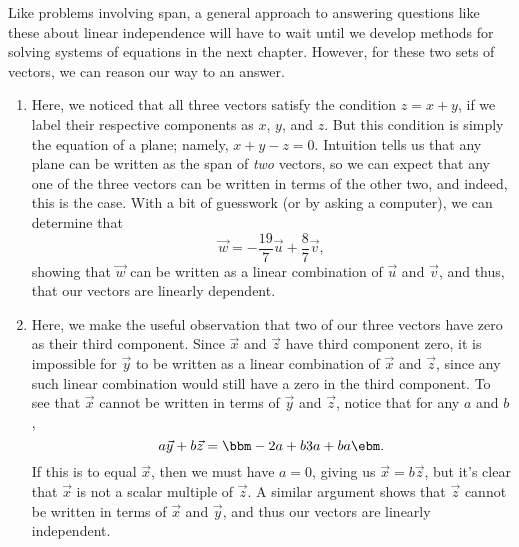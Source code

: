 {
Like problems involving span, a general approach to answering questions like these about linear independence will have to wait until we develop methods for solving systems of equations in the next chapter. However, for these two sets of vectors, we can reason our way to an answer.
\begin{enumerate}
\item Here, we noticed that all three vectors satisfy the condition $z=x+y$, if we label their respective components as $x$, $y$, and $z$. But this condition is simply the equation of a plane; namely, $x+y-z=0$. Intuition tells us that any plane can be written as the span of \textit{two} vectors, so we can expect that any one of the three vectors can be written in terms of the other two, and indeed, this is the case. With a bit of guesswork (or by asking a computer), we can determine that
\[
\vec{w} = -\frac{19}{7}\vec{u}+\frac{8}{7}\vec{v},
\]
showing that $\vec{w}$ can be written as a linear combination of $\vec{u}$ and $\vec{v}$, and thus, that our vectors are linearly dependent.

\item Here, we make the useful observation that two of our three vectors have zero as their third component. Since $\vec{x}$ and $\vec{z}$ have third component zero, it is impossible for $\vec{y}$ to be written as a linear combination of $\vec{x}$ and $\vec{z}$, since any such linear combination would still have a zero in the third component. To see that $\vec{x}$ cannot be written in terms of $\vec{y}$ and $\vec{z}$, notice that for any $a$ and $b$,
\[
a\vec{y}+b\vec{z} = \bbm -2a+b\\3a+b\\a\ebm.
\]
If this is to equal $\vec{x}$, then we must have $a=0$, giving us $\vec{x}=b\vec{z}$, but it's clear that $\vec{x}$ is not a scalar multiple of $\vec{z}$. A similar argument shows that $\vec{z}$ cannot be written in terms of $\vec{x}$ and $\vec{y}$, and thus our vectors are linearly independent.
\end{enumerate}
}

